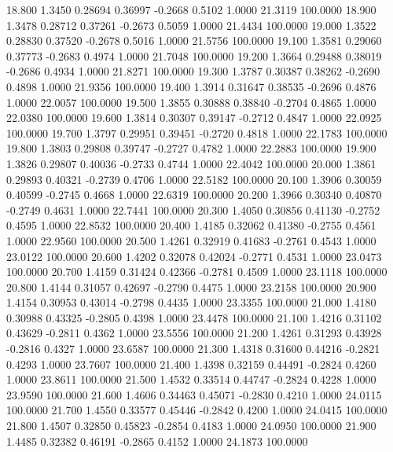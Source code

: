   18.800   1.3450   0.28694   0.36997  -0.2668   0.5102   1.0000  21.3119 100.0000
  18.900   1.3478   0.28712   0.37261  -0.2673   0.5059   1.0000  21.4434 100.0000
  19.000   1.3522   0.28830   0.37520  -0.2678   0.5016   1.0000  21.5756 100.0000
  19.100   1.3581   0.29060   0.37773  -0.2683   0.4974   1.0000  21.7048 100.0000
  19.200   1.3664   0.29488   0.38019  -0.2686   0.4934   1.0000  21.8271 100.0000
  19.300   1.3787   0.30387   0.38262  -0.2690   0.4898   1.0000  21.9356 100.0000
  19.400   1.3914   0.31647   0.38535  -0.2696   0.4876   1.0000  22.0057 100.0000
  19.500   1.3855   0.30888   0.38840  -0.2704   0.4865   1.0000  22.0380 100.0000
  19.600   1.3814   0.30307   0.39147  -0.2712   0.4847   1.0000  22.0925 100.0000
  19.700   1.3797   0.29951   0.39451  -0.2720   0.4818   1.0000  22.1783 100.0000
  19.800   1.3803   0.29808   0.39747  -0.2727   0.4782   1.0000  22.2883 100.0000
  19.900   1.3826   0.29807   0.40036  -0.2733   0.4744   1.0000  22.4042 100.0000
  20.000   1.3861   0.29893   0.40321  -0.2739   0.4706   1.0000  22.5182 100.0000
  20.100   1.3906   0.30059   0.40599  -0.2745   0.4668   1.0000  22.6319 100.0000
  20.200   1.3966   0.30340   0.40870  -0.2749   0.4631   1.0000  22.7441 100.0000
  20.300   1.4050   0.30856   0.41130  -0.2752   0.4595   1.0000  22.8532 100.0000
  20.400   1.4185   0.32062   0.41380  -0.2755   0.4561   1.0000  22.9560 100.0000
  20.500   1.4261   0.32919   0.41683  -0.2761   0.4543   1.0000  23.0122 100.0000
  20.600   1.4202   0.32078   0.42024  -0.2771   0.4531   1.0000  23.0473 100.0000
  20.700   1.4159   0.31424   0.42366  -0.2781   0.4509   1.0000  23.1118 100.0000
  20.800   1.4144   0.31057   0.42697  -0.2790   0.4475   1.0000  23.2158 100.0000
  20.900   1.4154   0.30953   0.43014  -0.2798   0.4435   1.0000  23.3355 100.0000
  21.000   1.4180   0.30988   0.43325  -0.2805   0.4398   1.0000  23.4478 100.0000
  21.100   1.4216   0.31102   0.43629  -0.2811   0.4362   1.0000  23.5556 100.0000
  21.200   1.4261   0.31293   0.43928  -0.2816   0.4327   1.0000  23.6587 100.0000
  21.300   1.4318   0.31600   0.44216  -0.2821   0.4293   1.0000  23.7607 100.0000
  21.400   1.4398   0.32159   0.44491  -0.2824   0.4260   1.0000  23.8611 100.0000
  21.500   1.4532   0.33514   0.44747  -0.2824   0.4228   1.0000  23.9590 100.0000
  21.600   1.4606   0.34463   0.45071  -0.2830   0.4210   1.0000  24.0115 100.0000
  21.700   1.4550   0.33577   0.45446  -0.2842   0.4200   1.0000  24.0415 100.0000
  21.800   1.4507   0.32850   0.45823  -0.2854   0.4183   1.0000  24.0950 100.0000
  21.900   1.4485   0.32382   0.46191  -0.2865   0.4152   1.0000  24.1873 100.0000
